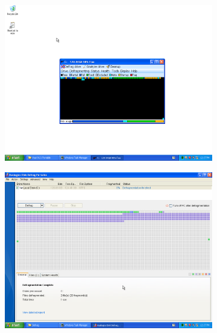 \documentclass[
	a4paper,
	oneside,
	DIV = 12,
	fontsize = 13pt,
	headings = normal,
]{scrartcl}
\begin{document}
\begin{figure}[!htbp]
\begin{subfigure}{0.5\textwidth}
				\caption{}
				\label{subfig:homework-02}
			\end{subfigure}%
			\vspace*{\floatsep}
			\begin{subfigure}{0.5\textwidth}
				\centering
				\includegraphics[height = 8\baselineskip]{./assets/lab-02-hw-03.png}
				\caption{}
				\label{subfig:homework-03}
			\end{subfigure}%
			\begin{subfigure}{0.5\textwidth}
				\centering
				\includegraphics[height = 8\baselineskip]{./assets/lab-02-hw-04.png}
				\caption{}
				\label{subfig:homework-04}
			\end{subfigure}%
			\vspace*{\floatsep}

\end{figure}
\end{document}
